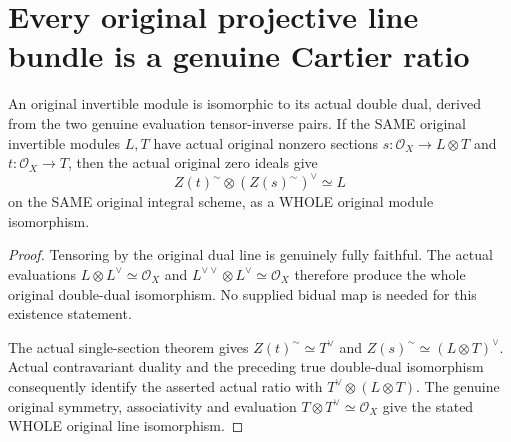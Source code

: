 \section{Every original projective line bundle is a genuine Cartier ratio}

\begin{theorem}
\label{thm:fc-original-line-section-ratio-iso}
\leanok
{}
An original invertible module is isomorphic to its actual double dual,
derived from the two genuine evaluation tensor-inverse pairs. If the
SAME original invertible modules $L,T$ have actual original nonzero
sections $s:\mathcal O_X\to L\otimes T$ and
$t:\mathcal O_X\to T$, then the actual original zero ideals give
\[
 Z(t)^{\sim}\otimes (Z(s)^{\sim})^\vee\simeq L
\]
on the SAME original integral scheme, as a WHOLE original module
isomorphism.
\end{theorem}
\begin{proof}
Tensoring by the original dual line is genuinely fully faithful. The
actual evaluations $L\otimes L^\vee\simeq\mathcal O_X$ and
$L^{\vee\vee}\otimes L^\vee\simeq\mathcal O_X$ therefore produce
the whole original double-dual isomorphism. No supplied bidual map is
needed for this existence statement.

The actual single-section theorem gives
$Z(t)^{\sim}\simeq T^\vee$ and
$Z(s)^{\sim}\simeq(L\otimes T)^\vee$. Actual contravariant duality
and the preceding true double-dual isomorphism consequently identify
the asserted actual ratio with $T^\vee\otimes(L\otimes T)$.
The genuine original symmetry, associativity and evaluation
$T\otimes T^\vee\simeq\mathcal O_X$ give the stated WHOLE original
line isomorphism.
\end{proof}

